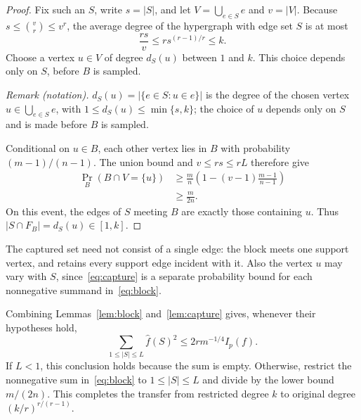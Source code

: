 \begin{proof}
Fix such an $S$, write $s=|S|$, and let $V=\bigcup_{e\in S}e$
and $v=|V|$. Because $s\le\binom vr\le v^r$, the average degree
of the hypergraph with edge set $S$ is at most
\[
 \frac{rs}{v}\le r s^{(r-1)/r}\le k.
\]
Choose a vertex $u\in V$ of degree $d_S(u)$ between $1$ and $k$.
This choice depends only on $S$, before $B$ is sampled.

\noindent\textit{Remark (notation).} $d_S(u)=|\{e\in S:u\in e\}|$ is the degree of the chosen vertex $u\in\bigcup_{e\in S}e$, with $1\le d_S(u)\le\min\{s,k\}$; the choice of $u$ depends only on $S$ and is made before $B$ is sampled.


Conditional on $u\in B$, each other vertex lies in $B$ with
probability $(m-1)/(n-1)$. The union bound and $v\le rs\le rL$
therefore give
\begin{align*}
 \Pr_B(B\cap V=\{u\})
 &\ge\frac mn\left(1-(v-1)\frac{m-1}{n-1}\right)\\
 &\ge\frac m{2n}.
\end{align*}
On this event, the edges of $S$ meeting $B$ are exactly those
containing $u$. Thus $|S\cap F_B|=d_S(u)\in[1,k]$.
\end{proof}

The captured set need not consist of a single edge: the block meets
one support vertex, and retains every support edge incident with it.
Also the vertex $u$ may vary with $S$, since~\eqref{eq:capture}
is a separate probability bound for each nonnegative summand
in~\eqref{eq:block}.

Combining Lemmas~\ref{lem:block} and~\ref{lem:capture} gives,
whenever their hypotheses hold,
\begin{equation}\label{eq:captured-mass}
 \sum_{1\le|S|\le L}\widehat f(S)^2
 \le 2r m^{-1/4}I_p(f).
\end{equation}
If $L<1$, this conclusion holds because the sum is empty.
Otherwise, restrict the nonnegative sum in~\eqref{eq:block} to
$1\le|S|\le L$ and divide by the lower bound $m/(2n)$.
This completes the transfer from restricted degree $k$ to original
degree $(k/r)^{r/(r-1)}$.
